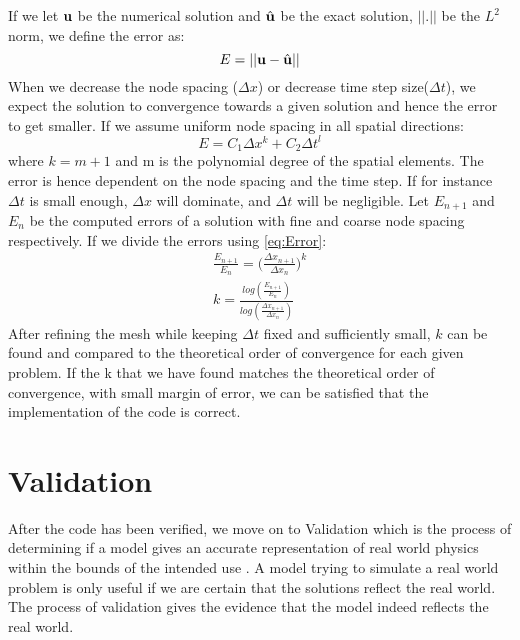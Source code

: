 If we let $\bold{u}$ be the numerical solution and $\hat{\bold{u}}$ be the exact solution, $|| . ||$ be the $L^2$ norm, we define the error as:
\begin{equation}
E = || \bold{u} - \hat{\bold{u}} ||
\end{equation}
When we decrease the node spacing ($ \Delta x $) or decrease time step size($\Delta t$), we expect the solution to convergence towards a given solution and hence the error to get smaller. If we assume uniform node spacing in all spatial directions: 
\begin{equation}
\label{eq:Error}
 E = C_1 \Delta x^k+ C_2 \Delta t^l 
\end{equation}
where $ k = m+1 $ and m is the polynomial degree of the spatial elements. The error is hence dependent on the node spacing and the time step.
If for instance $\Delta t$ is small enough, $\Delta x$ will dominate, and $\Delta t$ will be negligible. 
Let $E_{n+1}$ and $E_{n}$ be the computed errors of a solution with fine and coarse node spacing respectively.
If we divide the errors using \eqref{eq:Error}:
\begin{align}
\frac{E_{n+1}}{E_n} = \big( \frac{\Delta x_{n+1}}{\Delta x_n} \big)^k \\
k = \frac{log( \frac{E_{n+1}}{E_n}) }{ log(\frac{\Delta x_{n+1}}{\Delta x_n})}
\end{align}
After refining the mesh while keeping $\Delta t $ fixed and sufficiently small,
$k$ can be found and compared to the theoretical order of convergence for each given problem. If the k that we have found matches the theoretical order of convergence, with small margin of error, we can be satisfied that the implementation of the code is correct. \newline




\section{Validation}
After the code has been verified, we move on to Validation which is the process of determining if a model gives an accurate representation of real world physics within the bounds of the intended use \cite{Selin2014}. A model trying to simulate a real world problem is only useful if we are certain that the solutions reflect the real world. The process of validation gives the evidence that the model indeed reflects the real world. \newline

